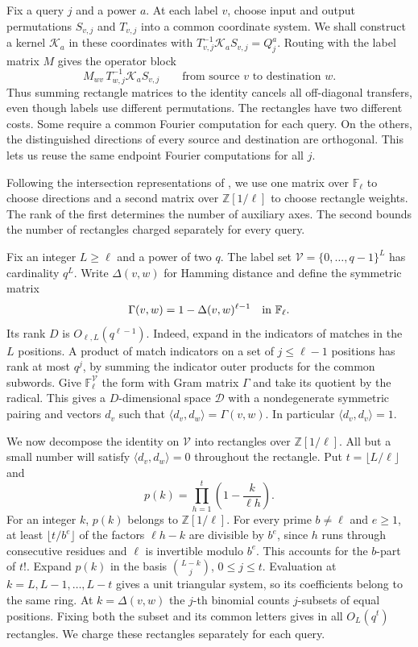 Fix a query \(j\) and a power \(a\). At each label \(v\), choose
input and output permutations \(S_{v,j}\) and \(T_{v,j}\) into a
common coordinate system. We shall construct a kernel \(\mathcal K_a\)
in these coordinates with
\(T_{v,j}^{-1}\mathcal K_a S_{v,j}=Q_j^a\).
Routing with the label matrix \(M\) gives the operator block
\begin{equation}\label{eq:kernel-routing-block}
  M_{wv}\,T_{w,j}^{-1}\mathcal K_a S_{v,j}
  \qquad\text{from source \(v\) to destination \(w\)} .
\end{equation}
Thus summing rectangle matrices to the identity cancels all
off-diagonal transfers, even though labels use different permutations.
The rectangles have two different costs. Some require a common
Fourier computation for each query. On the others, the distinguished
directions of every source and destination are orthogonal. This lets
us reuse the same endpoint Fourier computations for all \(j\).

Following the intersection representations of
\cite{Alon1998,Tape}, we use one matrix over \(\mathbb F_\ell\) to
choose directions and a second matrix over \(\mathbb Z[1/\ell]\) to
choose rectangle weights. The rank of the first determines the number
of auxiliary axes. The second bounds the number of rectangles charged
separately for every query.

Fix an integer \(L\ge\ell\) and a power of two \(q\). The label set
\(\mathcal V=\{0,\ldots,q-1\}^L\) has cardinality \(q^L\). Write
\(\Delta(v,w)\) for Hamming distance and define the symmetric matrix
\[
 \Gamma(v,w)=1-\Delta(v,w)^{\ell-1}\quad\hbox{in }\mathbb F_\ell .
\]
Its rank \(D\) is \(O_{\ell,L}(q^{\ell-1})\). Indeed, expand in the
indicators of matches in the \(L\) positions. A product of match
indicators on a set of \(j\le\ell-1\) positions has rank at most
\(q^j\), by summing the indicator outer products for the common
subwords. Give \(\mathbb F_\ell^{\mathcal V}\) the form with Gram
matrix \(\Gamma\) and take its quotient by the radical. This gives a
\(D\)-dimensional space \(\mathcal D\) with a nondegenerate symmetric
pairing and vectors \(d_v\) such that
\(\langle d_v,d_w\rangle=\Gamma(v,w)\). In particular
\(\langle d_v,d_v\rangle=1\).

We now decompose the identity on \(\mathcal V\) into rectangles over
\(\mathbb Z[1/\ell]\). All but a small number will satisfy
\(\langle d_v,d_w\rangle=0\) throughout the rectangle.
Put \(t=\lfloor L/\ell\rfloor\) and
\[
 p(k)=\prod_{h=1}^{t}\left(1-\frac{k}{\ell h}\right).
\]
For an integer \(k\), \(p(k)\) belongs to \(\mathbb Z[1/\ell]\).
For every prime \(b\ne\ell\) and \(e\ge1\), at least
\(\lfloor t/b^e\rfloor\) of the factors \(\ell h-k\) are divisible
by \(b^e\), since \(h\) runs through consecutive residues and \(\ell\)
is invertible modulo \(b^e\). This accounts for the \(b\)-part of
\(t!\). Expand \(p(k)\) in the basis \(\binom{L-k}{j}\), \(0\le j\le t\).
Evaluation at \(k=L,L-1,\ldots,L-t\) gives a unit triangular system,
so its coefficients belong to the same ring. At \(k=\Delta(v,w)\)
the \(j\)-th binomial counts \(j\)-subsets of equal positions. Fixing
both the subset and its common letters gives in all
\(O_L(q^t)\) rectangles. We charge these rectangles separately for
each query.

